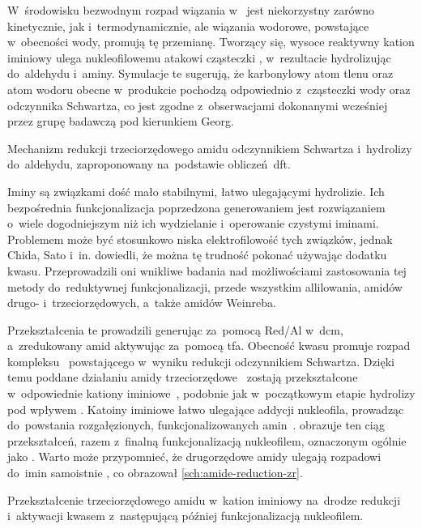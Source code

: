 W~środowisku bezwodnym rozpad wiązania  w~ jest niekorzystny zarówno
  kinetycznie, jak i~termodynamicznie, ale wiązania wodorowe, powstające w~obecności wody,
  promują tę przemianę.
Tworzący się, wysoce reaktywny kation iminiowy  ulega nukleofilowemu atakowi
  cząsteczki , w~rezultacie hydrolizując do~aldehydu i~aminy.
Symulacje te sugerują, że karbonylowy atom tlenu oraz atom wodoru obecne w~produkcie pochodzą
  odpowiednio z~cząsteczki wody oraz odczynnika Schwartza, co jest zgodne z~obserwacjami dokonanymi
  wcześniej przez grupę badawczą pod kierunkiem Georg.
\begin{scheme*}
  
  \caption{
    Mechanizm redukcji trzeciorzędowego amidu odczynnikiem Schwartza i~hydrolizy do~aldehydu,
    zaproponowany na~podstawie obliczeń~\gls{dft}.
  }
  \label{sch:schwartz-calc}
\end{scheme*}

Iminy są związkami dość mało stabilnymi, łatwo ulegającymi hydrolizie.
Ich bezpośrednia funkcjonalizacja poprzedzona generowaniem \insitu{} jest rozwiązaniem
  o~wiele dogodniejszym niż ich wydzielanie i~operowanie czystymi iminami.
Problemem może być stosunkowo niska elektrofilowość tych związków, jednak Chida, Sato i~in.
  dowiedli, że można tę trudność pokonać używając dodatku kwasu.
Przeprowadzili oni wnikliwe badania nad możliwościami zastosowania tej metody do~reduktywnej
  funkcjonalizacji, przede wszystkim allilowania, amidów drugo- i~trzeciorzędowych,
  a~także amidów Weinreba.

Przekształcenia te prowadzili generując \schwartz{} \insitu{} za~pomocą Red\-/Al w~\gls{dcm},
  a~zredukowany amid aktywując za~pomocą \gls{tfa}.
Obecność kwasu promuje rozpad
  kompleksu~ powstającego w~wyniku redukcji odczynnikiem Schwartza.
Dzięki temu poddane działaniu \schwartz{} amidy trzeciorzędowe~ zostają
  przekształcone w~odpowiednie kationy iminiowe~, podobnie jak w~początkowym
  etapie hydrolizy pod wpływem .
Katoiny iminiowe łatwo ulegające addycji nukleofila, prowadząc do~powstania rozgałęzionych,
  funkcjonalizowanych amin~.
 obrazuje ten ciąg przekształceń, razem z~finalną funkcjonalizacją
  nukleofilem, oznaczonym ogólnie jako .
Warto może przypomnieć, że drugorzędowe amidy ulegają rozpadowi do~imin samoistnie%
  , co obrazował \cref{sch:amide-reduction-zr}.
\begin{scheme*}
  
  \caption{
    Przekształcenie trzeciorzędowego amidu w~kation iminiowy na~drodze redukcji i~aktywacji kwasem
      z~następującą później funkcjonalizacją nukleofilem.
  }
  \label{sch:amide-tert-zr-reduction}
\end{scheme*}

